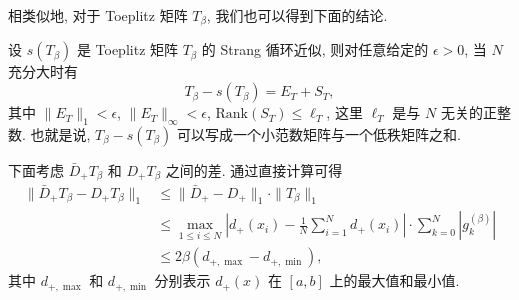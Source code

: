 \documentclass{ecnumaster}
\begin{document}
相类似地, 对于 Toeplitz 矩阵 $T_{\beta}$, 我们也可以得到下面的结论.   
\begin{theorem}\label{Th:s-T}
  设 $s(T_{\beta})$ 是 Toeplitz 矩阵 $T_{\beta}$ 的 Strang 循环近似, 
  则对任意给定的 $\epsilon>0$, 当 $N$ 充分大时有 
  $$T_{\beta} - s(T_{\beta}) = E_T + S_T,$$
  其中 $\|E_T\|_1<\epsilon$, $\|E_T\|_\infty<\epsilon$, $\mathrm{Rank}(S_T)\leq\ell_T$,
  这里 $\ell_T$ 是与 $N$ 无关的正整数.
  也就是说, $T_{\beta} - s(T_{\beta})$ 可以写成一个小范数矩阵与一个低秩矩阵之和.  
\end{theorem}

下面考虑 $\bar{D}_+ T_{\beta}$ 和 $D_+ T_{\beta}$ 之间的差.
通过直接计算可得
\begin{align*}
  \|\bar{D}_+ T_{\beta} - D_+ T_{\beta}\|_1 
  & \leq \|\bar{D}_+ - D_+\|_1\cdot \|T_{\beta}\|_1 \\
  & \leq \max _{1 \leq i \leq N} 
    \left|d_{+}(x_i) - \frac{1}{N} \sum\limits _{i=1}^{N} d_{+}(x_i)\right|
    \cdot \sum\limits _{k=0}^{N} |g_k^{(\beta)}|\\
  &\leq 2\beta (d_{+,\max}-d_{+,\min}),
\end{align*}
其中 $d_{+,\max}$ 和 $d_{+,\min}$ 分别表示 $d_+(x)$
在 $[a,b]$ 上的最大值和最小值.
  
\end{document}
